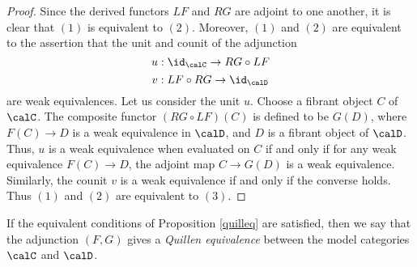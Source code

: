 \begin{Model Categories}
\begin{Already Read}
\begin{proof}
Since the derived functors $LF$ and $RG$ are adjoint to one another, it is clear that $(1)$ is equivalent to $(2)$. Moreover, $(1)$ and $(2)$ are equivalent to the assertion that the unit and counit of the adjunction
$$ u: \id_{\calC} \rightarrow RG \circ LF$$
$$ v: LF \circ RG \rightarrow \id_{\calD}$$
are weak equivalences. Let us consider the unit $u$. Choose a fibrant object $C$ of $\calC$.
The composite functor $(RG \circ LF)(C)$ is defined to be $G(D)$, where $F(C) \rightarrow D$ is a weak equivalence in $\calD$, and $D$ is a fibrant object of $\calD$. Thus, $u$ is a weak equivalence when evaluated on $C$ if and only if for any weak equivalence
$F(C) \rightarrow D$, the adjoint map $C \rightarrow G(D)$ is a weak equivalence. Similarly,
the counit $v$ is a weak equivalence if and only if the converse holds. Thus $(1)$ and $(2)$ are equivalent to $(3)$.
\end{proof}

If the equivalent conditions of Proposition \ref{quilleq} are satisfied, then we say that the adjunction $(F,G)$ gives a {\it Quillen equivalence} between the model categories $\calC$ and $\calD$.






\end{Already Read}
\end{Model Categories}
